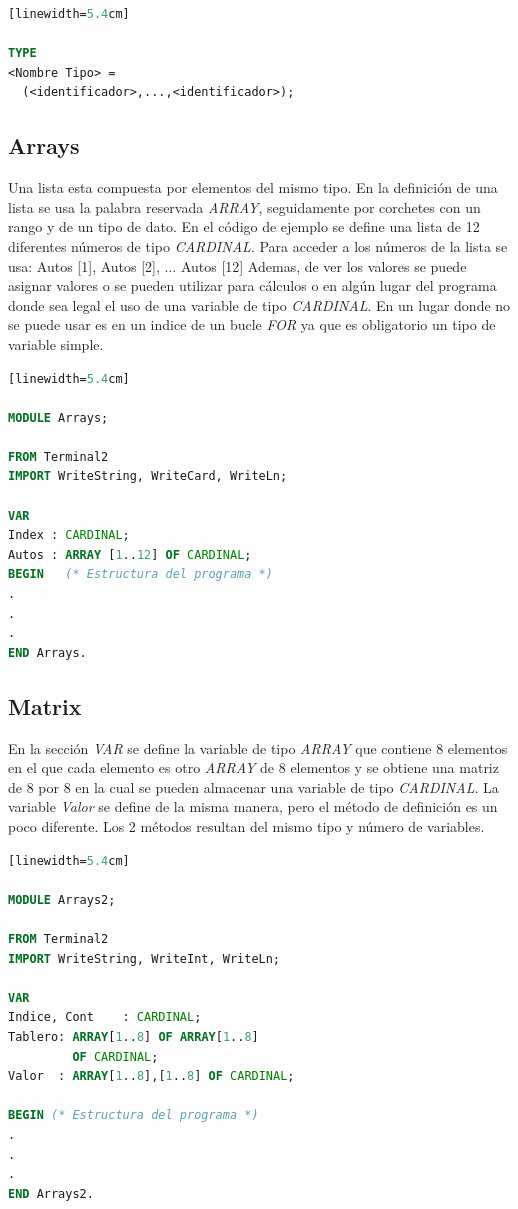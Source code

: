 \documentclass[10pt,journal,compsoc]{IEEEtran}
\begin{document}
\begin{lstlisting}[language=Modula-2, caption = {C\'odigo de declaraci\'on para un Scalar}][linewidth=5.4cm]

TYPE
<Nombre Tipo> = 
  (<identificador>,...,<identificador>);
\end{lstlisting}

\subsection{Arrays}
Una lista esta compuesta por elementos del mismo tipo. En la definici\'on de una lista se usa la palabra reservada \emph{ARRAY}, seguidamente por corchetes con un rango y de un tipo de dato. En el c\'odigo de ejemplo se define una lista de 12 diferentes n\'umeros de tipo \emph{CARDINAL}. Para acceder a los n\'umeros de la lista se usa:\newline
Autos [1], Autos [2], ... Autos [12]\newline
Ademas, de ver los valores se puede asignar valores o se pueden utilizar para c\'alculos o en alg\'un lugar del programa donde sea legal el uso de una variable de tipo \emph{CARDINAL}. En un lugar donde no se puede usar es en un indice de un bucle \emph{FOR} ya que es obligatorio un tipo de variable simple.
\begin{lstlisting}[language=Modula-2, caption = {C\'odigo de declaraci\'on para un array}][linewidth=5.4cm]

MODULE Arrays;

FROM Terminal2 
IMPORT WriteString, WriteCard, WriteLn;

VAR 
Index : CARDINAL;
Autos : ARRAY [1..12] OF CARDINAL;
BEGIN   (* Estructura del programa *)
.
.
.
END Arrays.
\end{lstlisting}

\subsection{Matrix}
En la secci\'on \emph{VAR} se define la variable de tipo \emph{ARRAY} que contiene 8 elementos en el que cada elemento es otro \emph{ARRAY} de 8 elementos y se obtiene una matriz de 8 por 8 en la cual se pueden almacenar una variable de tipo \emph{CARDINAL}. La variable \emph{Valor} se define de la misma manera, pero el m\'etodo de definici\'on es un poco diferente. Los 2 m\'etodos resultan del mismo tipo y n\'umero de variables.
\begin{lstlisting}[language=Modula-2, caption = {C\'odigo de declaraci\'on para una matriz}][linewidth=5.4cm]

MODULE Arrays2;

FROM Terminal2 
IMPORT WriteString, WriteInt, WriteLn;

VAR  
Indice, Cont	: CARDINAL;
Tablero: ARRAY[1..8] OF ARRAY[1..8] 
		 OF CARDINAL;
Valor  : ARRAY[1..8],[1..8] OF CARDINAL;

BEGIN (* Estructura del programa *)
.
.
.
END Arrays2.
\end{lstlisting}
\end{document}
